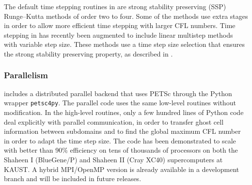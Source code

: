 The default time stepping routines in \sharpclaw are strong stability
preserving (SSP) Runge--Kutta methods of order two to four.
Some of the methods use extra stages in order to allow more efficient
time stepping with larger CFL numbers.
Time stepping in \sharpclaw has recently been augmented to include
linear multistep methods with variable step size.  These methods use
a time step size selection that ensures the strong stability preserving
property, as described in \cite{ssp_lmm_vss}.

\subsubsection{Parallelism}
\pyclaw includes a distributed parallel backend that uses PETSc through
the Python wrapper {\tt petsc4py}.  The parallel code uses the same low-level
routines without modification.  In the high-level routines, only a few
hundred lines of Python code deal explicitly with parallel communication,
in order to transfer ghost cell information between subdomains and to
find the global maximum CFL number in order to adapt the time step
size.  The code has been demonstrated to scale with better than 90\%
efficiency on tens of thousands of processors on both the Shaheen I
(BlueGene/P) and Shaheen II (Cray XC40) supercomputers at KAUST.
A hybrid MPI/OpenMP version is already available in a development branch
and will be included in future releases.
